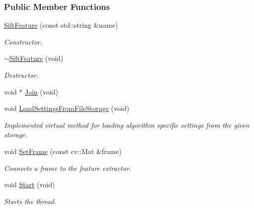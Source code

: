 \subsubsection*{Public Member Functions}
\begin{DoxyCompactItemize}
\item 
\hyperlink{group___feature_extractor_a73b7e3c9affef19366a1f3dc50ce5533}{Sift\-Feature} (const std\-::string \&name)
\begin{DoxyCompactList}\small\item\em Constructor. \end{DoxyCompactList}\item 
\hyperlink{group___feature_extractor_af35ea372a4c8aaf8a7486ec688214527}{$\sim$\-Sift\-Feature} (void)
\begin{DoxyCompactList}\small\item\em Destructor. \end{DoxyCompactList}\item 
void $\ast$ \hyperlink{group___core_a8f33f7750321d5df9188033e7e3e300d}{Join} (void)
\item 
void \hyperlink{group___feature_extractor_af19316d789598f612ee150deb2ee5137}{Load\-Settings\-From\-File\-Storage} (void)
\begin{DoxyCompactList}\small\item\em Implemented virtual method for loading algorithm specific settings from the given storage. \end{DoxyCompactList}\item 
void \hyperlink{group___feature_extractor_af261b9c5cac5ff1fb628317c7009c845}{Set\-Frame} (const cv\-::\-Mat \&frame)
\begin{DoxyCompactList}\small\item\em Connects a frame to the feature extractor. \end{DoxyCompactList}\item 
void \hyperlink{group___core_a2b42f82341afd2747ea093b6ac8b91cb}{Start} (void)
\begin{DoxyCompactList}\small\item\em Starts the thread. \end{DoxyCompactList}\end{DoxyCompactItemize}
